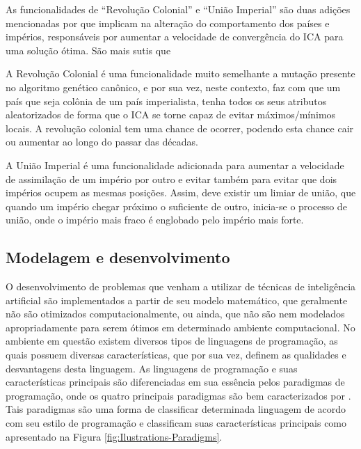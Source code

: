 	As funcionalidades de “Revolução Colonial” e “União Imperial” são duas adições mencionadas por \cite{roche2011imperialist} que implicam na alteração do comportamento dos países e impérios, responsáveis por aumentar a velocidade de convergência do ICA para uma solução ótima. São mais sutis que 

	A Revolução Colonial é uma funcionalidade muito semelhante a mutação presente no algoritmo genético canônico, e por sua vez, neste contexto, faz com que um país que seja colônia de um país imperialista, tenha todos os seus atributos aleatorizados de forma que o ICA se torne capaz de evitar máximos/mínimos locais. A revolução colonial tem uma chance de ocorrer, podendo esta chance cair ou aumentar ao longo do passar das décadas.

	A União Imperial é uma funcionalidade adicionada para aumentar a velocidade de assimilação de um império por outro e evitar também para evitar que dois impérios ocupem as mesmas posições. Assim, deve existir um limiar de união, que quando um império chegar próximo o suficiente de outro, inicia-se o processo de união, onde o império mais fraco é englobado pelo império mais forte.
    
    
    
    
    
    
    
    
    
    
    
\subsection{Modelagem e desenvolvimento}

O desenvolvimento de problemas que venham a utilizar de técnicas de inteligência artificial são implementados a partir de seu modelo matemático, que geralmente não são otimizados computacionalmente, ou ainda, que não são nem modelados apropriadamente para serem ótimos em determinado ambiente computacional. No ambiente em questão existem diversos tipos de linguagens de programação, as quais possuem diversas características, que por sua vez, definem as qualidades e desvantagens desta linguagem. As linguagens de programação e suas características principais são diferenciadas em sua essência pelos paradigmas de programação, onde os quatro principais paradigmas são bem caracterizados por  \cite{normark2013overview}. Tais paradigmas são uma forma de classificar determinada linguagem de acordo com seu estilo de programação e classificam suas características principais como apresentado na Figura \ref{fig:Ilustrations-Paradigms}.



